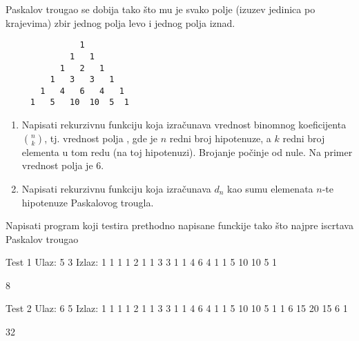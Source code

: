 \begin{Exercise}[label=108, difficulty=1]
 Paskalov trougao se dobija tako što mu je svako polje
(izuzev jedinica po krajevima) zbir jednog polja levo i
jednog polja iznad.
\begin{verbatim}
               1
             1   1
           1   2   1
         1   3   3   1
       1   4   6   4   1
     1   5   10  10  5  1
\end{verbatim}
\begin{enumerate}
\item Napisati rekurzivnu funkciju koja izračunava vrednost binomnog koeficijenta $\binom{n}{k}$, tj. vrednost polja , gde je $n$ redni broj hipotenuze, a $k$ redni broj elementa u tom redu (na toj hipotenuzi). Brojanje počinje od nule. Na primer vrednost polja  je $6$. 
\item Napisati rekurzivnu funkciju koja izračunava $d_n$ kao sumu elemenata $n$-te hipotenuze Paskalovog trougla.
\end{enumerate}

Napisati program koji testira prethodno napisane funckije tako što najpre iscrtava Paskalov trougao 

\begin{miditest}
\begin{test}{Test 1}
Ulaz:   5 3
Izlaz:  
               1
             1   1
           1   2   1
         1   3   3   1
       1   4   6   4   1
     1   5   10  10  5  1

     8
\end{test}
\end{miditest}

\begin{miditest}
\begin{test}{Test 2}
Ulaz:   6 5
Izlaz:  
  		           1
               1   1
             1   2   1
           1   3   3   1
         1   4   6   4   1
       1   5   10  10   5  1
     1   6  15   20  15  6   1

     32
\end{test}
\end{miditest}

\end{Exercise}
\begin{Answer}[ref=108]
\end{Answer}



